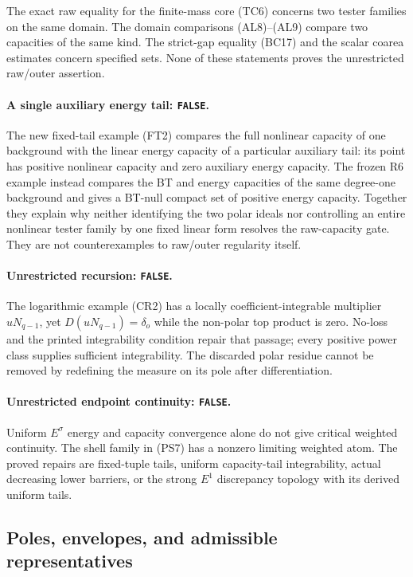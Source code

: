 \documentclass[11pt,a4paper]{article}
\numberwithin{equation}{section}
\theoremstyle{definition}
\theoremstyle{remark}
\begin{document}
The exact raw equality for the finite-mass core
(TC6) concerns two tester families on the same
domain.  The domain comparisons (AL8)--(AL9)
compare two capacities of the same kind.
The strict-gap equality (BC17) and the scalar
coarea estimates concern specified sets.
None of these statements proves the unrestricted
raw/outer assertion.

\paragraph{A single auxiliary energy tail: \texttt{FALSE}.}
The new fixed-tail example (FT2) compares the full
nonlinear capacity of one background with the
linear energy capacity of a particular auxiliary
tail: its point has positive nonlinear capacity
and zero auxiliary energy capacity. The frozen R6
example instead compares the BT and energy capacities
of the same degree-one background and gives a BT-null
compact set of positive energy capacity.
Together they explain why neither identifying
the two polar ideals nor controlling an entire
nonlinear tester family by one fixed linear
form resolves the raw-capacity gate.
They are not counterexamples to raw/outer
regularity itself.

\paragraph{Unrestricted recursion: \texttt{FALSE}.}
The logarithmic example (CR2) has a locally
coefficient-integrable multiplier
$uN_{q-1}$, yet
$D(uN_{q-1})=\delta_o$ while the non-polar
top product is zero.
No-loss and the printed integrability
condition repair that passage; every positive
power class supplies sufficient integrability.
The discarded polar residue cannot be removed
by redefining the measure on its pole after
differentiation.

\paragraph{Unrestricted endpoint continuity: \texttt{FALSE}.}
Uniform $E^\sigma$ energy and capacity convergence
alone do not give critical weighted continuity.
The shell family in (PS7) has a nonzero limiting
weighted atom.
The proved repairs are fixed-tuple tails,
uniform capacity-tail integrability, actual
decreasing lower barriers, or the strong
$E^1$ discrepancy topology with its derived
uniform tails.

\subsection{Poles, envelopes, and admissible representatives}
\end{document}
